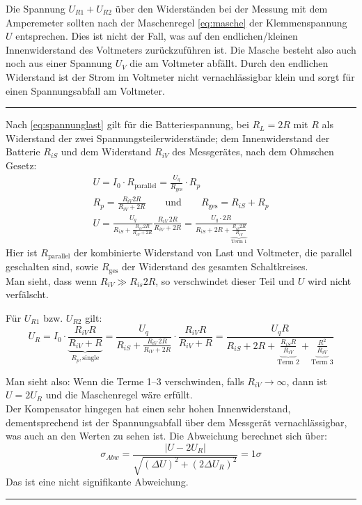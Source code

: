 Die Spannung \(U_{R1}+U_{R2}\) über den Widerständen bei der Messung mit dem Amperemeter sollten nach der Maschenregel \cref{eq:masche} der Klemmenspannung \(U\) entsprechen. Dies ist nicht der Fall, was auf den endlichen/kleinen Innenwiderstand des Voltmeters zurückzuführen ist. Die Masche besteht also auch noch aus einer Spannung \(U_V\) die am Voltmeter abfällt. Durch den endlichen Widerstand ist der Strom im Voltmeter nicht vernachlässigbar klein und sorgt für einen Spannungsabfall am Voltmeter.
\vspace{0.2cm}
\hrule \vspace{3pt}

Nach \cref{eq:spannunglast} gilt für die Batteriespannung, bei \(R_L=2R\) mit \(R\) als Widerstand der zwei Spannungsteilerwiderstände; dem Innenwiderstand der Batterie \(R_{iS}\) und dem Widerstand \(R_{iV}\) des Messgerätes, nach dem Ohmschen Gesetz:
\begin{gather}
    U=I_0\cdot R_{\text{parallel}}=\frac{U_q}{R_{\text{ges}}}\cdot R_p\\
    R_p=\frac{R_{iV}2R}{R_{iV}+2R}\qquad \text{und}\qquad R_{\text{ges}}=R_{iS}+R_p\\
    U = \frac{U_q}{R_{iS}+\frac{R_{iV}\,2R}{R_{iV}+2R}} \frac{R_{iV}\,2R}{R_{iV}+2R}= \frac{U_q \cdot 2R}{R_{iS} + 2R +\underbrace{\frac{R_{iS} 2R}{R_{iV}}}_{\text{Term 1}}}
\end{gather}
Hier ist \(R_{\text{parallel}}\) der kombinierte Widerstand von Last und Voltmeter, die parallel geschalten sind, sowie \(R_{\text{ges}}\) der Widerstand des gesamten Schaltkreises.\\
Man sieht, dass wenn \(R_{iV}\gg R_{is}2R\), so verschwindet dieser Teil und \(U\) wird nicht verfälscht. 

Für \(U_{R1}\) bzw. \(U_{R2}\) gilt:
\begin{equation}
    U_{R}= I_0\cdot\underbrace{ \frac{R_{iV}R}{R_{iV}+R}}_{R_p, \text{single}}=\frac{U_q}{R_{iS}+\frac{R_{iV}\,2R}{R_{iV}+2R}}\cdot \frac{R_{iV}R}{R_{iV}+R}=\frac{U_q R}{R_{iS}+2R+\underbrace{\frac{R_{iS}R}{R_{iV}}}_{\text{Term 2}}+\underbrace{\frac{R^2}{R_{iV}}}_{\text{Term 3}}}
\end{equation}  

Man sieht also: Wenn die Terme \numrange{1}{3} verschwinden, falls \(R_{iV}\to \infty\), dann ist \(U=2U_R\) und die Maschenregel wäre erfüllt. \\
Der Kompensator hingegen hat einen sehr hohen Innenwiderstand, dementsprechend ist der Spannungsabfall über dem Messgerät vernachlässigbar, was auch an den Werten zu sehen ist. Die Abweichung berechnet sich über:
\begin{equation}
    \sigma_{Abw}=\frac{|U-2U_R|}{\sqrt{(\Delta U)^2+(2\Delta U_R)^2}}=1\sigma
\end{equation}
Das ist eine nicht signifikante Abweichung. 
\vspace{0.2cm}
\hrule \vspace{3pt}

